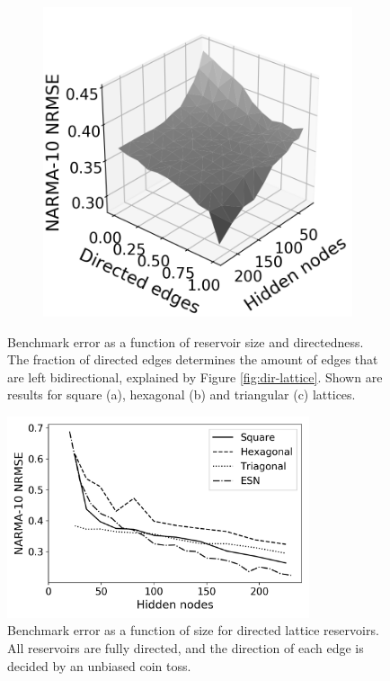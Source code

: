 \begin{figure}[t]
\begin{subfigure}{.32\textwidth}
    \caption{}
    \label{fig:rt-dir-perf-trisurf-hex}
  \end{subfigure}
  \begin{subfigure}{.32\textwidth}
    \centering
    \includegraphics[width=1.0\linewidth]{figures/rt-dir-perf-tri.png}
    \caption{}
    \label{fig:rt-dir-perf-trisurf-tri}
  \end{subfigure}
  \caption{
    Benchmark error as a function of reservoir size and directedness. The
fraction of directed edges determines the amount of edges that are left
bidirectional, explained by Figure \protect\ref{fig:dir-lattice}. Shown are
results for square (a), hexagonal (b) and triangular (c) lattices.
  }
  \label{fig:rt-dir-perf-trisurf}

  \centering
  \includegraphics[width=3.5in]{figures/rt-dir-perf.png}
  \caption{
    Benchmark error as a function of size for directed lattice reservoirs. All
reservoirs are fully directed, and the direction of each edge is decided by an
unbiased coin toss.
  }
  \label{fig:rt-dir-perf}
\end{figure}


